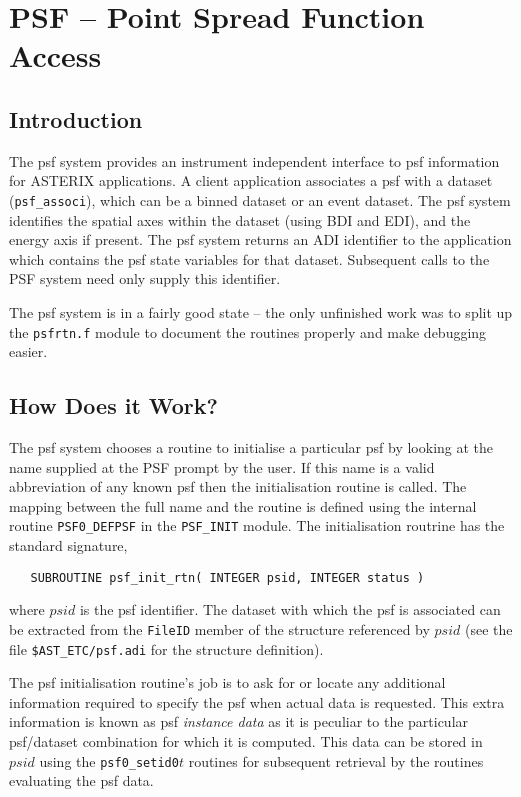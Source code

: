\chapter{PSF -- Point Spread Function Access}

\section{Introduction}

The psf system provides an instrument independent interface to psf
information for ASTERIX applications. A client application
associates a psf with a dataset (\verb+psf_associ+), which can be 
a binned dataset or an event dataset. The psf system identifies the
spatial axes within the dataset (using BDI and EDI), and the energy
axis if present. The psf system returns an ADI identifier to the application
which contains the psf state variables for that dataset. Subsequent
calls to the PSF system need only supply this identifier. 

The psf system is in a fairly good state -- the only unfinished work
was to split up the \verb+psfrtn.f+ module to document the routines
properly and make debugging easier.

\section{How Does it Work?}

The psf system chooses a routine to initialise a particular psf by
looking at the name supplied at the PSF prompt by the user. If this
name is a valid abbreviation of any known psf then the initialisation
routine is called. The mapping between the full name and the routine
is defined using the internal routine \verb+PSF0_DEFPSF+ in the 
\verb+PSF_INIT+ module. The initialisation routrine has the standard
signature,
\begin{verbatim}
   SUBROUTINE psf_init_rtn( INTEGER psid, INTEGER status )
\end{verbatim}
where $psid$ is the psf identifier. The dataset with which the psf
is associated can be extracted from the \verb+FileID+ member of the
structure referenced by $psid$ (see the file \verb+$AST_ETC/psf.adi+
for the structure definition).

The psf initialisation routine's job is to ask for or locate any
additional information required to specify the psf when actual data is
requested. This extra information is known as psf {\em instance data}
as it is peculiar to the particular psf/dataset combination for which
it is computed. This data can be stored in $psid$ using the 
\verb+psf0_setid0+$t$ routines for subsequent retrieval by the routines
evaluating the psf data.

